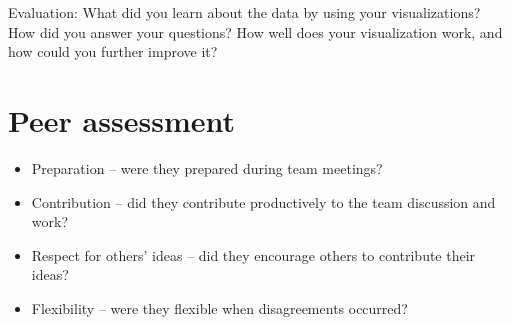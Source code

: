\documentclass[a4paper,10pt]{article}
\begin{document}
Evaluation: What did you learn about the data by using your visualizations? How did you answer your questions? How well does your visualization work, and how could you further improve it?

\section{Peer assessment}

\begin{itemize}
  \item Preparation – were they prepared during team meetings?
  \item Contribution – did they contribute productively to the team discussion and work?
  \item Respect for others’ ideas – did they encourage others to contribute their ideas?
  \item Flexibility – were they flexible when disagreements occurred?
\end{itemize}

\setlength{\parskip}{0.1\baselineskip}

\newpage

\listoffigures
\end{document}
